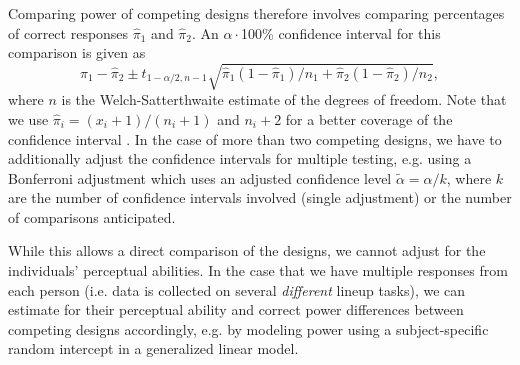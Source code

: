 Comparing power of competing designs therefore involves comparing percentages of correct responses $\widehat{\pi}_1$ and $\widehat{\pi}_2$. An $\alpha\cdot$100\% confidence interval for this comparison is given as 
\begin{equation}\label{eq:comp}
\widehat{\pi}_1 - \widehat{\pi}_2 \pm t_{1-\alpha/2, n-1} \sqrt{\widehat{\pi}_1(1-\widehat{\pi}_1)/n_1 + \widehat{\pi}_2(1-\widehat{\pi}_2)/n_2},
\end{equation}
where $n$ is the Welch-Satterthwaite \cite{welch:1947} estimate of the degrees of freedom. Note that we use $\widehat{\pi}_i = (x_i+1)/(n_i+1)$ and $n_i+2$ for a better coverage of the confidence interval \cite{agresti:1998}. In the case of more than two competing designs, we have to additionally adjust the confidence intervals for multiple testing, e.g. using a Bonferroni adjustment which uses an adjusted  confidence level $\tilde{\alpha} = \alpha/k$, where $k$ are the number of confidence intervals involved (single adjustment) or the number of comparisons anticipated.

While this allows a direct comparison of the designs, we cannot adjust for the individuals' perceptual abilities.
In the case that we have multiple responses from each person (i.e. data is collected on several {\it different} lineup tasks), we can estimate for their perceptual ability and correct power differences between competing designs accordingly, e.g. by modeling power using  a subject-specific random intercept in a generalized linear model.







